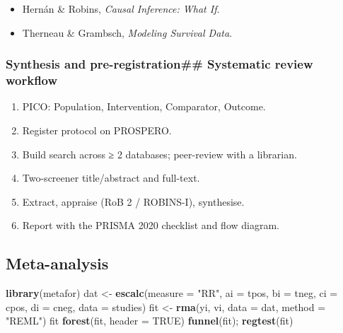 \documentclass[
]{article}
\newenvironment{Shaded}{\begin{snugshade}}{\end{snugshade}}
\newcommand{\AttributeTok}[1]{\textcolor[rgb]{0.13,0.29,0.53}{#1}}
\newcommand{\ConstantTok}[1]{\textcolor[rgb]{0.56,0.35,0.01}{#1}}
\newcommand{\FunctionTok}[1]{\textcolor[rgb]{0.13,0.29,0.53}{\textbf{#1}}}
\newcommand{\NormalTok}[1]{#1}
\newcommand{\OtherTok}[1]{\textcolor[rgb]{0.56,0.35,0.01}{#1}}
\newcommand{\StringTok}[1]{\textcolor[rgb]{0.31,0.60,0.02}{#1}}
\providecommand{\tightlist}{%
  \setlength{\itemsep}{0pt}\setlength{\parskip}{0pt}}
\begin{document}
\begin{itemize}
\tightlist
\item
  Hernán \& Robins, \emph{Causal Inference: What If}.
\item
  Therneau \& Grambsch, \emph{Modeling Survival Data}.
\end{itemize}

\subsubsection{Synthesis and pre-registration\#\# Systematic review
workflow}\label{synthesis-and-pre-registration-systematic-review-workflow}

\begin{enumerate}
\def\labelenumi{\arabic{enumi}.}
\tightlist
\item
  PICO: Population, Intervention, Comparator, Outcome.
\item
  Register protocol on PROSPERO.
\item
  Build search across ≥ 2 databases; peer-review with a librarian.
\item
  Two-screener title/abstract and full-text.
\item
  Extract, appraise (RoB 2 / ROBINS-I), synthesise.
\item
  Report with the PRISMA 2020 checklist and flow diagram.
\end{enumerate}

\subsection{Meta-analysis}\label{meta-analysis}

\begin{Shaded}
\begin{Highlighting}[]
\FunctionTok{library}\NormalTok{(metafor)}
\NormalTok{dat }\OtherTok{\textless{}{-}} \FunctionTok{escalc}\NormalTok{(}\AttributeTok{measure =} \StringTok{"RR"}\NormalTok{,}
              \AttributeTok{ai =}\NormalTok{ tpos, }\AttributeTok{bi =}\NormalTok{ tneg, }\AttributeTok{ci =}\NormalTok{ cpos, }\AttributeTok{di =}\NormalTok{ cneg,}
              \AttributeTok{data =}\NormalTok{ studies)}
\NormalTok{fit }\OtherTok{\textless{}{-}} \FunctionTok{rma}\NormalTok{(yi, vi, }\AttributeTok{data =}\NormalTok{ dat, }\AttributeTok{method =} \StringTok{"REML"}\NormalTok{)}
\NormalTok{fit}
\FunctionTok{forest}\NormalTok{(fit, }\AttributeTok{header =} \ConstantTok{TRUE}\NormalTok{)}
\FunctionTok{funnel}\NormalTok{(fit); }\FunctionTok{regtest}\NormalTok{(fit)}
\end{Highlighting}
\end{Shaded}
\end{document}
